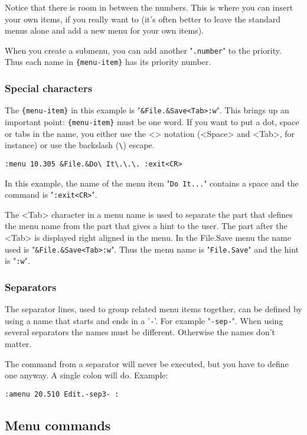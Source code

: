 Notice that there is room in between the numbers.
This is where you can insert your own items, if you really want to (it's often better to leave the standard menus alone and add a new menu for your own items).

When you create a submenu, you can add another "\verb!.number!" to the priority.
Thus each name in \verb!{menu-item}! has its priority number.

\subsubsection{Special characters}
The \verb!{menu-item}! in this example is "\verb!&File.&Save<Tab>:w!".
This brings up an important point: \verb!{menu-item}! must be one word.
If you want to put a dot, space or tabs in the name, you either use the <> notation (<Space> and <Tab>, for instance) or use the backslash (\verb!\!) escape.

\begin{Verbatim}[samepage=true]
 :menu 10.305 &File.&Do\ It\.\.\. :exit<CR>
\end{Verbatim}

In this example, the name of the menu item "\verb!Do It...!" contains a space and the command is "\verb!:exit<CR>!".

The <Tab> character in a menu name is used to separate the part that defines the menu name from the part that gives a hint to the user.
The part after the <Tab> is displayed right aligned in the menu.
In the File.Save menu the name used is "\verb!&File.&Save<Tab>:w!".
Thus the menu name is "\verb!File.Save!" and the hint is "\verb!:w!".

\subsubsection{Separators}
The separator lines, used to group related menu items together, can be defined by using a name that starts and ends in a '\verb!-!'.
For example "\verb!-sep-!".
When using several separators the names must be different.
Otherwise the names don't matter.

The command from a separator will never be executed, but you have to define one anyway.
A single colon will do.
Example:

\begin{Verbatim}[samepage=true]
 :amenu 20.510 Edit.-sep3- :
\end{Verbatim}
\subsection{Menu commands}

